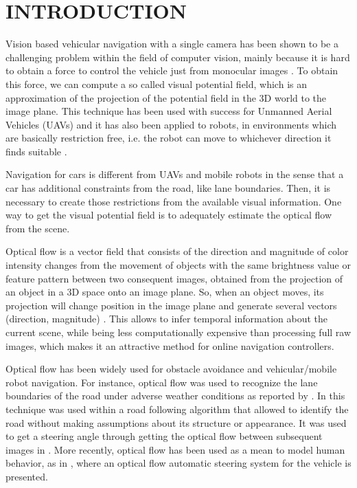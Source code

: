 \documentclass[letterpaper, 10 pt, conference]{ieeeconf}  %
\begin{document}
\section{INTRODUCTION}

Vision based vehicular navigation with a single camera has been shown to be a challenging problem within the field of computer vision, mainly because it is hard to obtain a force to control the vehicle just from monocular images \cite{bonin2008visual,ohnishi2008visual}. To obtain this force, we can compute a so called visual potential field, which is an approximation of the projection of the potential field in the 3D world to the image plane. This technique has been used with success for Unmanned Aerial Vehicles (UAVs) \cite{miao2017optical} and it has also been applied to robots, in environments which are basically restriction free, i.e. the robot can move to whichever direction it finds suitable \cite{huang2006visual}. 

Navigation for cars is different from UAVs and mobile robots in the sense that a car has additional constraints from the road, like lane boundaries. Then, it is necessary to create those restrictions from the available visual information. One way to get the visual potential field is to adequately estimate the optical flow from the scene.

Optical flow is a vector field that consists of the direction and magnitude of color intensity changes from the movement of objects with the same brightness value or feature pattern between two consequent images, obtained from the projection of an object in a 3D space onto an image plane. So, when an object moves, its projection will change position in the image plane and generate several vectors (direction, magnitude) \cite{camus1995calculating}. This allows to infer temporal information about the current scene, while being less computationally expensive than processing full raw images, which makes it an attractive method for online navigation controllers. 

Optical flow has been widely used for obstacle avoidance and vehicular/mobile robot navigation. For instance, optical flow was used to recognize the lane boundaries of the road under adverse weather conditions as reported by \cite{gern2002vision}. In \cite{lieb2005adaptive} this technique was used within a road following algorithm that allowed to identify the road without making assumptions about its structure or appearance. It was used to get a steering angle through getting the optical flow between subsequent images in \cite{yoshimoto1995automatic}. More recently, optical flow has been used as a mean to model human behavior, as in \cite{okafuji2015development}, where an optical flow automatic steering system for the vehicle is presented.
\end{document}
